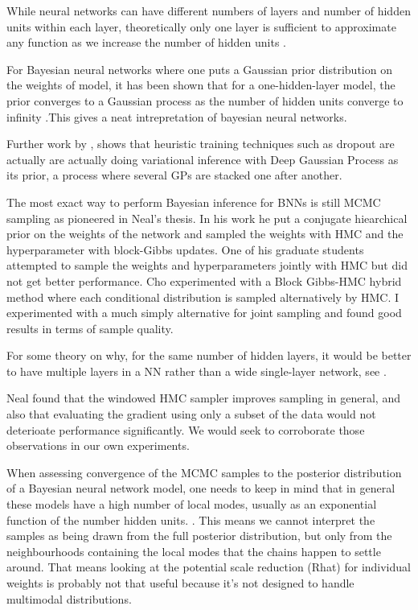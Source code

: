 \documentclass[12pt]{report}
\begin{document}
While neural networks can have different numbers of layers and number of hidden
units within each layer, theoretically only one layer is sufficient to
approximate any function as we increase the number of hidden units \cite{hornik1991approximation}. 

For Bayesian neural networks where one puts a Gaussian prior distribution on the weights of model, it has been shown that for a one-hidden-layer model, the prior converges to a Gaussian process as the number of hidden units converge to infinity \cite{neal2012bayesian}.This gives a neat intrepretation of bayesian neural networks. 

Further work by \cite{gal2015dropout}, shows that heuristic training techniques such as dropout \cite{srivastava2014dropout}  are actually are actually doing variational inference with Deep Gaussian Process \cite{damianou2013deep} as its prior, a process where several GPs are stacked one after another. 

The most exact way to perform Bayesian inference for BNNs is still MCMC sampling as pioneered in Neal's thesis. In his work he put a conjugate hiearchical prior on the weights of the network and sampled the weights with HMC and the hyperparameter with block-Gibbs updates. One of his graduate students attempted to sample the weights and hyperparameters jointly with HMC but did not get better performance. Cho experimented with a Block Gibbs-HMC hybrid method where each conditional distribution is sampled alternatively by HMC. I experimented with a much simply alternative for joint sampling and found good results in terms of sample quality. 

For some theory on why, for the same number of hidden layers, it would be better to have multiple layers in a NN rather than a wide single-layer network, see \cite{montufar2014number}. 

Neal found that the windowed HMC sampler improves sampling in general, and also that evaluating the gradient using only a subset of the data would not deterioate performance significantly. We would seek to corroborate those observations in our own experiments.

When assessing convergence of the MCMC samples to the posterior distribution of a Bayesian neural network model, one needs to keep in mind that in general these models have a high number of local modes, usually as an exponential function of the number hidden units. \cite{bishop1995neural}. This means we cannot interpret the samples as being drawn from the full posterior distribution, but only from the neighbourhoods containing the local modes that the chains happen to settle around. That means looking at the potential scale reduction (Rhat) for individual weights is probably not that useful because it's not designed to handle multimodal distributions.  
\end{document}
